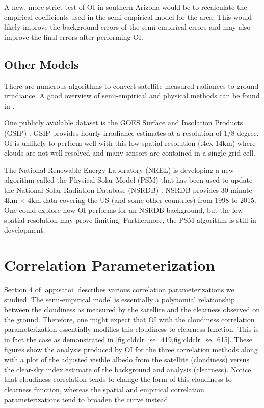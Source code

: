 A new, more strict test of OI in southern Arizona would be to
recalculate the empirical coefficients used in the semi-empirical
model for the area.
This would likely improve the background errors of the semi-empirical
errors and may also improve the final errors after performing OI.

\subsection{Other Models}
There are numerous algorithms to convert satellite measured radiances
to ground irradiance.
A good overview of semi-empirical and physical methods can be found in
\cite{Perez2013a,Miller2013}.

One publicly available dataset is the GOES Surface and Insolation
Products (GSIP) \citep{Sengupta2010}.
GSIP provides hourly irradiance estimates at a resolution of 1/8
degree.
OI is unlikely to perform well with this low spatial resolution
({\raise.4ex \hbox{\texttildelow}}14km) where clouds are not well
resolved and many sensors are contained in a single grid cell.

The National Renewable Energy Laboratory (NREL) is developing a new
algorithm called the Physical Solar Model (PSM) that has been used to update
the National Solar Radiation Database (NSRDB) \citep{Sengupta2014}.
NSRDB provides 30 minute 4km $\times$ 4km data covering the US (and
some other countries) from 1998 to 2015.
One could explore how OI performs for an NSRDB background, but the low
spatial resolution may prove limiting.
Furthermore, the PSM algorithm is still in development.

\section{Correlation Parameterization}
\label{sec:corr_param}

Section 4 of \cref{app:satoi} describes various correlation
parameterizations we studied.
The semi-empirical model is essentially a polynomial relationship
between the cloudiness as measured by the satellite and the clearness
observed on the ground.
Therefore, one might expect that OI with the cloudiness correlation
parameterization essentially modifies this cloudiness to clearness
function.
This is in fact the case as demonstrated in
\cref{fig:cldclr_se_419,fig:cldclr_se_615}.
These figures show the analysis produced by OI for the three
correlation methods along with a plot of the adjusted visible albedo
from the satellite (cloudiness) versus the clear-sky index estimate of the
background and analysis (clearness).
Notice that cloudiness correlation tends to change the form of this
cloudiness to clearness function, whereas the spatial and empirical
correlation parameterizations tend to broaden the curve instead.

